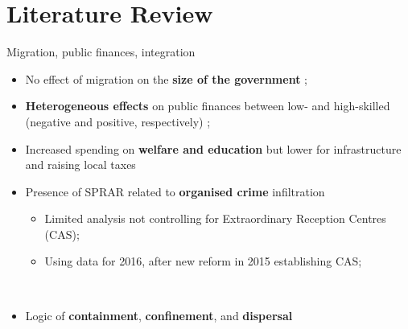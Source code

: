 \documentclass[xcolor={dvipsnames}]{beamer}
\begin{document}
\section{Literature Review}

\begin{frame}{Migration, public finances, integration}

\fontsize{9}{7.2}\selectfont
\begin{itemize}
\justifying
    \item No effect of migration on the\textbf{ size of the government }\citep{gerdes2011}; \\

    \vspace{5}
    
    \item \textbf{Heterogeneous effects} on public finances between low- and high-skilled (negative and positive, respectively) \citep*{senses2022}; \\

    \vspace{5}
    
\item Increased spending on \textbf{welfare and education} but lower for infrastructure and raising local taxes \citep{chevalier2023} \\

\vspace{5}

\item Presence of SPRAR related to \textbf{organised crime} infiltration \citep{proietti2022} \\

\vspace{5}

\begin{itemize}
\fontsize{8}{7.2}\selectfont
    \item Limited analysis not controlling for Extraordinary Reception Centres (CAS); \\
    \vspace{3}
    \item Using data for 2016, after new reform in 2015 establishing CAS; 
\end{itemize}\\
\vspace{5}
\item Logic of \textbf{containment}, \textbf{confinement}, and \textbf{dispersal} \citep{campesi2018}

\end{itemize}
\end{frame}
\end{document}
